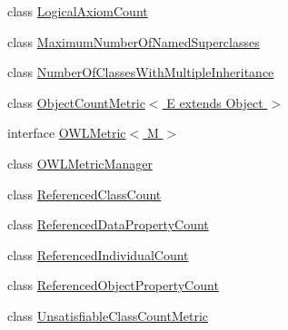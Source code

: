 \begin{DoxyCompactItemize}
\item 
class \hyperlink{classorg_1_1semanticweb_1_1owlapi_1_1metrics_1_1_logical_axiom_count}{Logical\-Axiom\-Count}
\item 
class \hyperlink{classorg_1_1semanticweb_1_1owlapi_1_1metrics_1_1_maximum_number_of_named_superclasses}{Maximum\-Number\-Of\-Named\-Superclasses}
\item 
class \hyperlink{classorg_1_1semanticweb_1_1owlapi_1_1metrics_1_1_number_of_classes_with_multiple_inheritance}{Number\-Of\-Classes\-With\-Multiple\-Inheritance}
\item 
class \hyperlink{classorg_1_1semanticweb_1_1owlapi_1_1metrics_1_1_object_count_metric_3_01_e_01extends_01_object_01_4}{Object\-Count\-Metric$<$ E extends Object $>$}
\item 
interface \hyperlink{interfaceorg_1_1semanticweb_1_1owlapi_1_1metrics_1_1_o_w_l_metric_3_01_m_01_4}{O\-W\-L\-Metric$<$ M $>$}
\item 
class \hyperlink{classorg_1_1semanticweb_1_1owlapi_1_1metrics_1_1_o_w_l_metric_manager}{O\-W\-L\-Metric\-Manager}
\item 
class \hyperlink{classorg_1_1semanticweb_1_1owlapi_1_1metrics_1_1_referenced_class_count}{Referenced\-Class\-Count}
\item 
class \hyperlink{classorg_1_1semanticweb_1_1owlapi_1_1metrics_1_1_referenced_data_property_count}{Referenced\-Data\-Property\-Count}
\item 
class \hyperlink{classorg_1_1semanticweb_1_1owlapi_1_1metrics_1_1_referenced_individual_count}{Referenced\-Individual\-Count}
\item 
class \hyperlink{classorg_1_1semanticweb_1_1owlapi_1_1metrics_1_1_referenced_object_property_count}{Referenced\-Object\-Property\-Count}
\item 
class \hyperlink{classorg_1_1semanticweb_1_1owlapi_1_1metrics_1_1_unsatisfiable_class_count_metric}{Unsatisfiable\-Class\-Count\-Metric}
\end{DoxyCompactItemize}
